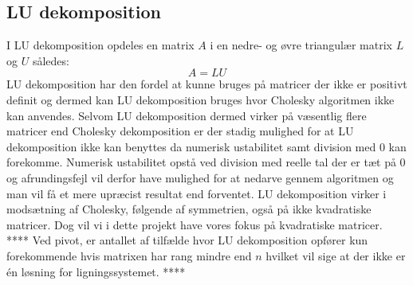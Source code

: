 \documentclass{article}
\begin{document}
\subsection{LU dekomposition}
I LU dekomposition opdeles en matrix $A$ i en nedre- og øvre triangulær matrix $L$ og $U$ således:
$$A = LU$$
LU dekomposition har den fordel at kunne bruges på matricer der ikke er positivt definit og dermed kan LU dekomposition bruges hvor Cholesky algoritmen ikke kan anvendes. Selvom LU dekomposition dermed virker på væsentlig flere matricer end Cholesky dekomposition er der stadig mulighed for at LU dekomposition ikke kan benyttes da numerisk ustabilitet samt division med $0$ kan forekomme. Numerisk ustabilitet opstå ved division med reelle tal der er tæt på $0$ og afrundingsfejl vil derfor have mulighed for at nedarve gennem algoritmen og man vil få et mere upræcist resultat end forventet. LU dekomposition virker i modsætning af Cholesky, følgende af symmetrien, også på ikke kvadratiske matricer. Dog vil vi i dette projekt have vores fokus på kvadratiske matricer.
\newline
**** 
Ved pivot, er antallet af tilfælde hvor LU dekomposition opfører kun forekommende hvis matrixen har rang mindre end $n$ hvilket vil sige at der ikke er én løsning for ligningssystemet.
****
\newline
\end{document}
